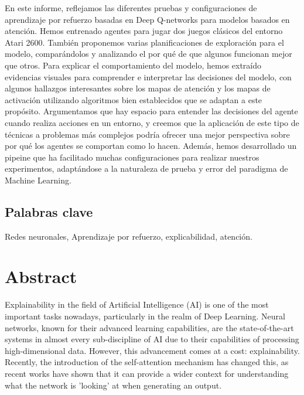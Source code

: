 En este informe, reflejamos las diferentes pruebas y configuraciones de aprendizaje por refuerzo basadas en Deep Q-networks para modelos basados en atención. Hemos entrenado agentes para jugar dos juegos clásicos del entorno Atari 2600. También proponemos varias planificaciones de exploración para el modelo, comparándolos y analizando el por qué de que algunos funcionan mejor que otros. Para explicar el comportamiento del modelo, hemos extraído evidencias visuales para comprender e interpretar las decisiones del modelo, con algunos hallazgos interesantes sobre los mapas de atención y los mapas de activación utilizando algoritmos bien establecidos que se adaptan a este propósito. Argumentamos que hay espacio para entender las decisiones del agente cuando realiza acciones en un entorno, y creemos que la aplicación de este tipo de técnicas a problemas más complejos podría ofrecer una mejor perspectiva sobre por qué los agentes se comportan como lo hacen. Además, hemos desarrollado un pipeine que ha facilitado muchas configuraciones para realizar nuestros experimentos, adaptándose a la naturaleza de prueba y error del paradigma de Machine Learning.

\vfill
\section*{Palabras clave}
Redes neuronales, Aprendizaje por refuerzo, explicabilidad, atención.

\newpage
\chapter*{Abstract}
Explainability in the field of Artificial Intelligence (AI) is one of the most important tasks nowadays, particularly in the realm of Deep Learning. Neural networks, known for their advanced learning capabilities, are the state-of-the-art systems in almost every sub-discipline of AI due to their capabilities of processing high-dimensional data. However, this advancement comes at a cost: explainability. Recently, the introduction of the self-attention mechanism has changed this, as recent works have shown that it can provide a wider context for understanding what the network is 'looking' at when generating an output.

